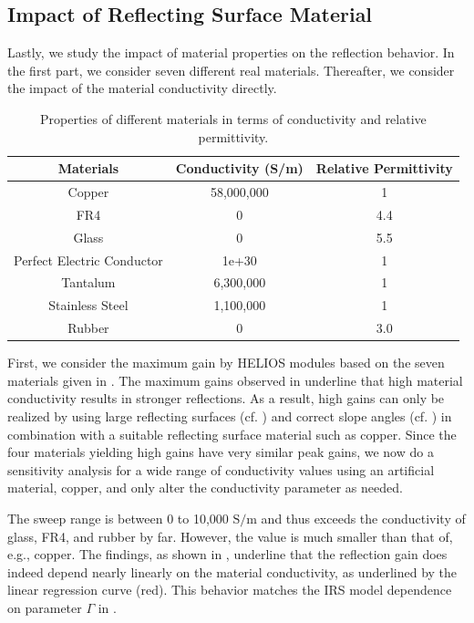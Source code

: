 \subsection{Impact of Reflecting Surface Material} \label{Impact of Material Conductivity}
Lastly, we study the impact of material properties on the reflection behavior. In the first part, we consider seven different real materials. Thereafter, we consider the impact of the material conductivity directly. 
\begin{table}[tb] %
			\caption{Properties of different materials in terms of conductivity and relative permittivity.}
		\footnotesize
	\label{Conductivity table}
	\centering
	\begin{tabular}{c|c|c}
		\textbf{Materials} & \textbf{Conductivity} (\si{\siemens/\meter}) & \textbf{Relative Permittivity} \\
		\hline
		Copper & 58,000,000 & 1 \\
		\hline
		FR4 & 0 & 4.4 \\
		\hline
		Glass & 0 & 5.5 \\
		\hline
		Perfect Electric Conductor & 1e+30 & 1 \\
		\hline
		Tantalum & 6,300,000 & 1 \\
		\hline
		Stainless Steel & 1,100,000 & 1 \\
		\hline
		Rubber & 0 & 3.0
	\end{tabular}
\end{table}
First, we consider the maximum gain by HELIOS modules based on the seven materials given in . The maximum gains observed in  underline that high material conductivity results in stronger reflections. As a result, high gains can only be realized by using large reflecting surfaces (cf. ) and correct slope angles (cf. ) in combination with a suitable reflecting surface material such as copper. Since the four materials yielding high gains have very similar peak gains, we now do a sensitivity analysis for a wide range of conductivity values using an artificial material, copper, and only alter the conductivity parameter as needed.

The sweep range is between $\num{0}$ to 10,000 $\si{\siemens/\meter}$ and thus exceeds the conductivity of glass, FR4, and rubber by far. However, the value is much smaller than that of, e.g., copper. The findings, as shown in , underline that the reflection gain does indeed depend nearly linearly on the material conductivity, as underlined by the linear regression curve (red). This behavior matches the IRS model dependence on parameter $\Gamma$ in . 
 
